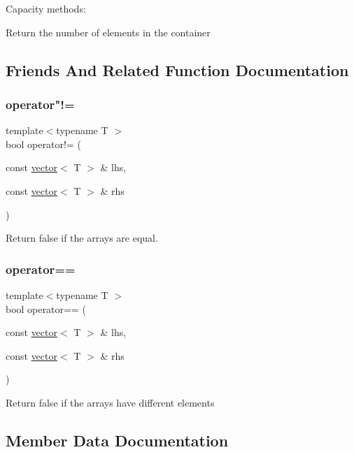 Capacity methods\+: 

Return the number of elements in the container 

\subsection{Friends And Related Function Documentation}
\mbox{\label{classsc_1_1vector_a2c27118e557a04c2dc8d062e1afe730a}} 
\subsubsection{\texorpdfstring{operator"!=}{operator!=}}
{\footnotesize\ttfamily template$<$typename T $>$ \\
bool operator!= (\begin{DoxyParamCaption}\item[{const \hyperlink{classsc_1_1vector}{vector}$<$ T $>$ \&}]{lhs,  }\item[{const \hyperlink{classsc_1_1vector}{vector}$<$ T $>$ \&}]{rhs }\end{DoxyParamCaption})\hspace{0.3cm}{\ttfamily [friend]}}

Return false if the arrays are equal. \mbox{\label{classsc_1_1vector_a33679563540934e4c3e487aa12a63424}} 
\subsubsection{\texorpdfstring{operator==}{operator==}}
{\footnotesize\ttfamily template$<$typename T $>$ \\
bool operator== (\begin{DoxyParamCaption}\item[{const \hyperlink{classsc_1_1vector}{vector}$<$ T $>$ \&}]{lhs,  }\item[{const \hyperlink{classsc_1_1vector}{vector}$<$ T $>$ \&}]{rhs }\end{DoxyParamCaption})\hspace{0.3cm}{\ttfamily [friend]}}

Return false if the arrays have different elements 

\subsection{Member Data Documentation}
\mbox{\label{classsc_1_1vector_ae4c67859be8cfdd445d2700d55125184}} 

